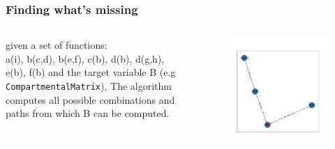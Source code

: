 \begin{frame}
\frametitle{Finding what's missing}
\begin{columns}
  \begin{column}{0.3\textwidth}
  given a set of functions:\\
        a(i), b(c,d), b(e,f), c(b),
        d(b), d(g,h),
        e(b),
        f(b)
  and the target variable {\color{red}B}
  (e.g \texttt{CompartmentalMatrix}),
  The algorithm computes all possible combinations
  and paths from which {\color{red}B} can be computed.
  \end{column}
  \begin{column}{0.7\textwidth}
      \begin{center}
      \begin{figure}
  	\includegraphics[width=\textwidth]{StartNodes.pdf}
      \end{figure}
       \end{center}
  \end{column}
\end{columns}
\end{frame}

